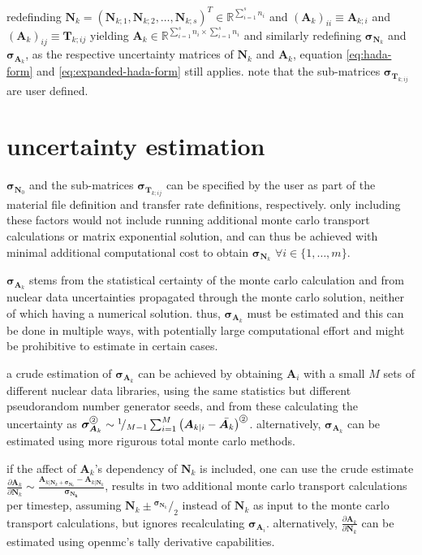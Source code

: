 \documentclass[a4paper]{article}
\newcommand*\Hada{\tikz[baseline=(char.base)]{\node[shape=circle,draw,inner sep=0.7pt] (char) {\tiny{2}};}}
\newcommand*\rfrac[2]{{}^{#1}\!/_{#2}}
\begin{document}
redefinding $\bm{N}_k=\left(\bm{N}_{k;1},\bm{N}_{k;2},\ldots,\bm{N}_{k;s}\right)^T\in\mathbb{R}^{\sum_{i=1}^s n_i}$ and $(\bm{A}_k)_{ii}\equiv\bm{A}_{k;i}$ and $(\bm{A}_k)_{ij}\equiv\bm{T}_{k;ij}$ yielding $\bm{A}_k\in\mathbb{R}^{\sum_{i=1}^s n_i\times \sum_{i=1}^s n_i}$ and similarly redefining $\bm{\sigma}_{\bm{N}_k}$ and $\bm{\sigma}_{\bm{A}_k}$, as the respective uncertainty matrices of $\bm{N}_k$ and $\bm{A}_k$, equation \ref{eq:hada-form} and \ref{eq:expanded-hada-form} still applies. note that the sub-matrices $\bm{\sigma}_{\bm{T}_{k;ij}}$ are user defined.


\section*{uncertainty estimation}
$\bm{\sigma}_{\bm{N}_0}$ and the sub-matrices $\bm{\sigma}_{\bm{T}_{k;ij}}$ can be specified by the user as part of the material file definition and transfer rate definitions, respectively.
only including these factors would not include running additional monte carlo transport calculations or matrix exponential solution, and can thus be achieved with minimal additional computational cost to obtain $\bm{\sigma}_{\bm{N}_{k}}$ $\forall i\in\{1,\ldots,m\}$.

$\bm{\sigma}_{\bm{A}_k}$ stems from the statistical certainty of the monte carlo calculation and from nuclear data uncertainties propagated through the monte carlo solution, neither of which having a numerical solution. thus, $\bm{\sigma}_{\bm{A}_k}$ must be estimated and this can be done in multiple ways, with potentially large computational effort and might be prohibitive to estimate in certain cases.

a crude estimation of $\bm{\sigma}_{\bm{A}_k}$ can be achieved by obtaining $\bm{A}_i$ with a small $M$ sets of different nuclear data libraries, using the same statistics but different pseudorandom number generator seeds, and from these calculating the uncertainty as $\bm{\sigma}_{\bm{A}_k}^{\Hada}\sim\rfrac{1}{M-1}\sum_{i=1}^M \left(\bm{A}_{k\vert i}-\bar{\bm{A}_k}\right)^{\Hada}$. alternatively, $\bm{\sigma}_{\bm{A}_k}$ can be estimated using more rigurous total monte carlo methods.

if the affect of $\bm{A}_k$'s dependency of $\bm{N}_k$ is included, one can use the crude estimate $\frac{\partial \bm{A}_k}{\partial \bm{N}_k} \sim \frac{\bm{A}_{k\vert \bm{N}_k+\bm{\sigma}_{\bm{N}_k}} - \bm{A}_{k\vert \bm{N}_k}}{\bm{\sigma_{\bm{N}_k}}}$, results in two additional monte carlo transport calculations per timestep, assuming $\bm{N}_k\pm\rfrac{\bm{\sigma}_{\bm{N}_k}}{2}$ instead of $\bm{N}_k$ as input to the monte carlo transport calculations, but ignores recalculating $\bm{\sigma}_{\bm{A}_i}$.
alternatively, $\frac{\partial \bm{A}_k}{\partial \bm{N}_k}$ can be estimated using openmc's tally derivative capabilities.
\end{document}
